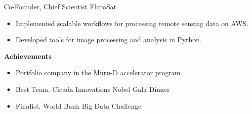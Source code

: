 
{Co-Founder, Chief Scientist}
{FluroSat}{}{}
{%
  \begin{itemize}
    \item Implemented scalable workflows for processing remote sensing data on AWS.
    \item Developed tools for image processing and analysis in Python.
  \end{itemize}
  \textbf{Achievements}
  \begin{itemize}
    \item Portfolio company in the Muru-D accelerator program
    \item Best Team, Cicada Innovations Nobel Gala Dinner
    \item Finalist, World Bank Big Data Challenge
  \end{itemize}
}




